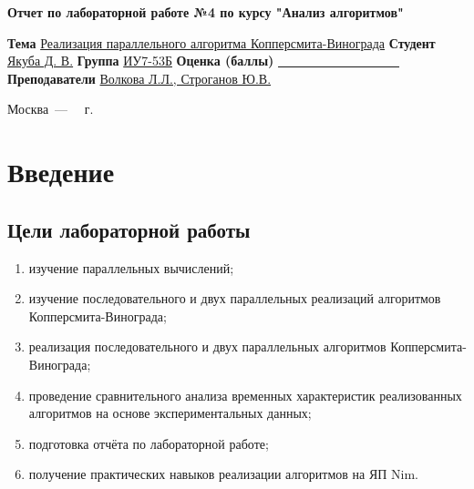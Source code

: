 \documentclass[12pt]{report}
\begin{document}
\begin{titlepage}
	
	\begin{center}
		\Large\textbf{Отчет по лабораторной работе №4 по курсу "Анализ алгоритмов"}\newline
	\end{center}
	
	\noindent\textbf{Тема} \underline{Реализация параллельного алгоритма Копперсмита-Винограда}\newline\newline\newline
	\noindent\textbf{Студент} \underline{Якуба Д. В.}\newline\newline
	\noindent\textbf{Группа} \underline{ИУ7-53Б}\newline\newline
	\noindent\textbf{Оценка (баллы)} \underline{~~~~~~~~~~~~~~~~~~~}\newline\newline
	\noindent\textbf{Преподаватели} \underline{Волкова Л.Л., Строганов Ю.В.}\newline
	
	\begin{center}
		\vfill
		Москва~---~\the\year
		~г.
	\end{center}
\end{titlepage}

\tableofcontents

\newpage
\chapter*{Введение}
\section*{Цели лабораторной работы}
\begin{enumerate}
\item изучение параллельных вычислений;
\item изучение последовательного и двух параллельных реализаций алгоритмов Копперсмита-Винограда;
\item реализация последовательного и двух параллельных алгоритмов Копперсмита-Винограда;
\item проведение сравнительного анализа временных характеристик реализованных алгоритмов на основе экспериментальных данных;
\item подготовка отчёта по лабораторной работе;
\item получение практических навыков реализации алгоритмов на ЯП Nim.
\end{enumerate}
\end{document}
